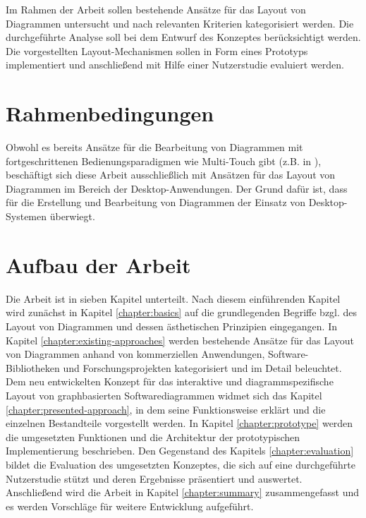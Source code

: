 Im Rahmen der Arbeit sollen bestehende Ansätze für das Layout von Diagrammen untersucht und nach relevanten Kriterien kategorisiert werden. Die durchgeführte Analyse soll bei dem Entwurf des Konzeptes berücksichtigt werden. Die vorgestellten Layout-Mechanismen sollen in Form eines Prototyps implementiert und anschließend mit Hilfe einer Nutzerstudie evaluiert werden.

\section{Rahmenbedingungen}
\label{sec:thesis-conditions}

Obwohl es bereits Ansätze für die Bearbeitung von Diagrammen mit fortgeschrittenen Bedienungsparadigmen wie Multi-Touch gibt (z.B. in \cite{FrischHeydekorn10Diagram}), beschäftigt sich diese Arbeit ausschließlich mit Ansätzen für das Layout von Diagrammen im Bereich der Desktop-Anwendun\-gen. Der Grund dafür ist, dass für die Erstellung und Bearbeitung von Diagrammen der Einsatz von Desktop-Systemen überwiegt.

\section{Aufbau der Arbeit}

Die Arbeit ist in sieben Kapitel unterteilt. Nach diesem einführenden Kapitel wird zunächst in Kapitel \ref{chapter:basics} auf die grundlegenden Begriffe bzgl. des Layout von Diagrammen und dessen ästhetischen Prinzipien eingegangen. In Kapitel \ref{chapter:existing-approaches} werden bestehende Ansätze für das Layout von Diagrammen anhand von kommerziellen Anwendungen, Software-Bibliotheken und Forschungsprojekten kategorisiert und im Detail beleuchtet. Dem neu entwickelten Konzept für das interaktive und diagrammspezifische Layout von graphbasierten Softwarediagrammen widmet sich das Kapitel \ref{chapter:presented-approach}, in dem seine Funktionsweise erklärt und die einzelnen Bestandteile vorgestellt werden. In Kapitel \ref{chapter:prototype} werden die umgesetzten Funktionen und die Architektur der prototypischen Implementierung beschrieben. Den Gegenstand des Kapitels \ref{chapter:evaluation} bildet die Evaluation des umgesetzten Konzeptes, die sich auf eine durchgeführte Nutzerstudie stützt und deren Ergebnisse präsentiert und auswertet. Anschließend wird die Arbeit in Kapitel \ref{chapter:summary} zusammengefasst und es werden Vorschläge für weitere Entwicklung aufgeführt.
